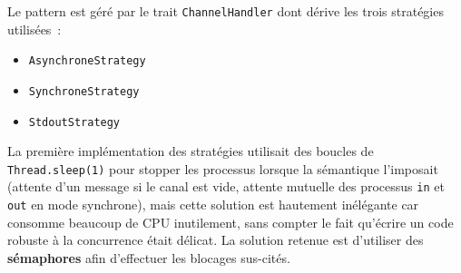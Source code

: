 \documentclass[11pt]{article} %
\begin{document}
Le pattern est géré par le trait \texttt{ChannelHandler} dont dérive les trois stratégies utilisées~:
\begin{itemize}
	\item \texttt{AsynchroneStrategy}
	\item \texttt{SynchroneStrategy}
	\item \texttt{StdoutStrategy}
\end{itemize}

La première implémentation des stratégies utilisait des boucles de \texttt{Thread.sleep(1)} pour stopper les processus lorsque la sémantique l'imposait (attente d'un message si le canal est vide, attente mutuelle des processus \texttt{in} et \texttt{out} en mode synchrone), mais cette solution est hautement inélégante car consomme beaucoup de CPU inutilement, sans compter le fait qu'écrire un code robuste à la concurrence était délicat. La solution retenue est d'utiliser des \textbf{sémaphores} afin d'effectuer les blocages sus-cités.
\end{document}
